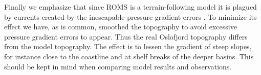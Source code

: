 Finally we emphasize that since ROMS is a terrain-following model it is plagued by currents created by the inescapable pressure gradient errors \citep{}. To minimize its effect we have, as is common, smoothed the topography to avoid excessive pressure gradient errors to appear. Thus the real Oslofjord topography differs from the model topography. The effect is to lessen the gradient of steep slopes, for instance close to the coastline and at shelf breaks of the deeper basins. This should be kept in mind when comparing model results and observations.   


\clearpage
